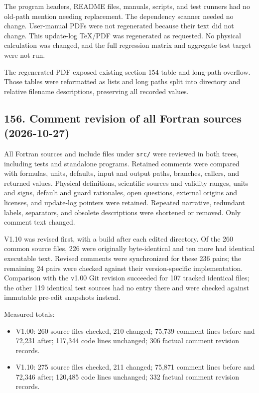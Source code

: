 \documentclass[english,a4paper]{my_memo}
\providecommand{\tightlist}{\setlength{\itemsep}{0pt}\setlength{\parskip}{0pt}}
\begin{document}
The program headers, README files, manuals, scripts, and test runners had no old-path mention needing replacement. The dependency scanner needed no change. User-manual PDFs were not regenerated because their text did not change. This update-log TeX/PDF was regenerated as requested. No physical calculation was changed, and the full regression matrix and aggregate test target were not run.

The regenerated PDF exposed existing section 154 table and long-path overflow. Those tables were reformatted as lists and long paths split into directory and relative filename descriptions, preserving all recorded values.

\subsection{156. Comment revision of all Fortran sources (2026-10-27)}\label{156-comment-revision-of-all-fortran-sources-2026-10-27}

All Fortran sources and include files under \texttt{src/} were reviewed in both trees, including tests and standalone programs. Retained comments were compared with formulas, units, defaults, input and output paths, branches, callers, and returned values. Physical definitions, scientific sources and validity ranges, units and signs, default and guard rationales, open questions, external origins and licenses, and update-log pointers were retained. Repeated narrative, redundant labels, separators, and obsolete descriptions were shortened or removed. Only comment text changed.

V1.10 was revised first, with a build after each edited directory. Of the 260 common source files, 226 were originally byte-identical and ten more had identical executable text. Revised comments were synchronized for these 236 pairs; the remaining 24 pairs were checked against their version-specific implementation. Comparison with the v1.00 Git revision succeeded for 107 tracked identical files; the other 119 identical test sources had no entry there and were checked against immutable pre-edit snapshots instead.

Measured totals:

\begin{itemize}
\tightlist
\item
  V1.00: 260 source files checked, 210 changed; 75,739 comment lines before and 72,231 after; 117,344 code lines unchanged; 306 factual comment revision records.
\item
  V1.10: 275 source files checked, 211 changed; 75,871 comment lines before and 72,346 after; 120,485 code lines unchanged; 332 factual comment revision records.
\end{itemize}
\end{document}
